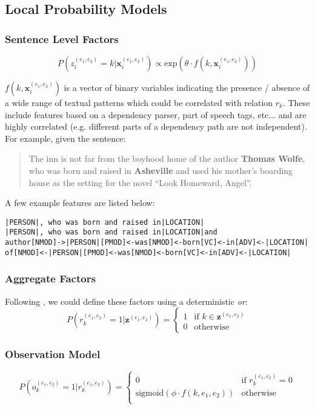 \documentclass[12pt]{article}
\begin{document}
\subsection{Local Probability Models}
\subsubsection{Sentence Level Factors}
\[
P(z^{(e_1,e_2)}_i=k|\mathbf{x}^{(e_1,e_2)}_i) \propto \text{exp}\left(\theta \cdot f(k,\mathbf{x}^{(e_1,e_2)}_i)\right)
\]

$f(k,\mathbf{x}^{(e_1,e_2)}_i)$ is a vector of binary variables indicating the presence / absence of a wide range of textual patterns which
could be correlated with relation $r_k$.  These include features based on a dependency parser, part of speech tags, etc... and
are highly correlated (e.g. different parts of a dependency path are not independent).  
For example, given the sentence:
\begin{quotation}
  The inn is not far from the boyhood home of the author {\bf Thomas Wolfe}, who was born and raised in {\bf Asheville} and used his mother's boarding house as the setting for the novel ``Look Homeward, Angel''.
\end{quotation}
A few example features are listed below:
\begin{verbatim}
|PERSON|, who was born and raised in|LOCATION|
|PERSON|, who was born and raised in|LOCATION|and 
author[NMOD]->|PERSON|[PMOD]<-was[NMOD]<-born[VC]<-in[ADV]<-|LOCATION|
of[NMOD]<-|PERSON|[PMOD]<-was[NMOD]<-born[VC]<-in[ADV]<-|LOCATION|
\end{verbatim}

\subsubsection{Aggregate Factors}
\label{deterministic_or}
Following \cite{Hoffmann11}, we could define these factors using a deterministic \emph{or}:
\[
P(r^{(e_1,e_2)}_k=1|\mathbf{z}^{(e_1,e_2)}) =
\left\{
\begin{array}{ll}
  1  & \mbox{if } k \in \mathbf{z}^{(e_1,e_2)} \\
  0 & \mbox{otherwise } 
  \end{array}
\right.
\]

\subsubsection{Observation Model}
\[
P(o^{(e_1,e_2)}_k=1|r^{(e_1,e_2)}_k) = 
\left\{
\begin{array}{ll}
  0 & \mbox{if } r^{(e_1,e_2)}_k = 0 \\
  \text{sigmoid}\left(\phi \cdot f(k,e_1,e_2)\right) & \mbox{otherwise }  \\
  \end{array}
\right.
\]
\end{document}
